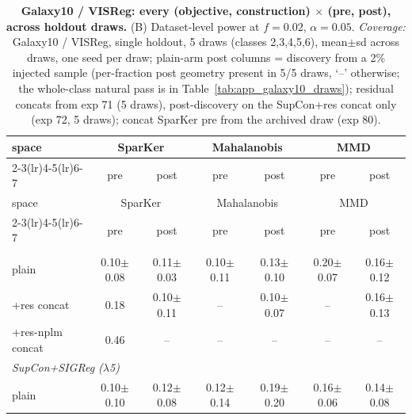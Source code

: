 \begin{center}
\small
\begin{longtable}{lcccccc}
\caption{\textbf{Galaxy10 / VISReg: every (objective, construction) $\times$ (pre, post), across holdout draws.} (B) Dataset-level power at $f=0.02$, $\alpha=0.05$. \emph{Coverage:} Galaxy10 / VISReg, single holdout, 5 draws (classes 2,3,4,5,6), mean$\pm$sd across draws, one seed per draw; plain-arm post columns = discovery from a 2\% injected sample (per-fraction post geometry present in 5/5 draws, `--' otherwise; the whole-class natural pass is in Table~\ref{tab:app_galaxy10_draws}); residual concats from exp 71 (5 draws), post-discovery on the SupCon+res concat only (exp 72, 5 draws); concat SparKer pre from the archived draw (exp 80).}\label{tab:grid_galaxy10_visreg_b}\\
\toprule
space & \multicolumn{2}{c}{SparKer} & \multicolumn{2}{c}{Mahalanobis} & \multicolumn{2}{c}{MMD} \\
\cmidrule(lr){2-3}\cmidrule(lr){4-5}\cmidrule(lr){6-7}
& pre & post & pre & post & pre & post \\
\midrule
\endfirsthead
\toprule
space & \multicolumn{2}{c}{SparKer} & \multicolumn{2}{c}{Mahalanobis} & \multicolumn{2}{c}{MMD} \\
\cmidrule(lr){2-3}\cmidrule(lr){4-5}\cmidrule(lr){6-7}
& pre & post & pre & post & pre & post \\
\midrule
\endhead
\bottomrule
\endfoot
\multicolumn{7}{l}{\emph{SupCon}} \\
\quad plain & 0.10$\pm$0.08 & 0.11$\pm$0.03 & 0.10$\pm$0.11 & 0.13$\pm$0.10 & 0.20$\pm$0.07 & 0.16$\pm$0.12 \\
\quad +res concat & 0.18 & 0.10$\pm$0.11 & -- & 0.10$\pm$0.07 & -- & 0.16$\pm$0.13 \\
\quad +res-nplm concat & 0.46 & -- & -- & -- & -- & -- \\
\multicolumn{7}{l}{\emph{SupCon+SIGReg ($\lambda$5)}} \\
\quad plain & 0.10$\pm$0.10 & 0.12$\pm$0.08 & 0.12$\pm$0.14 & 0.19$\pm$0.20 & 0.16$\pm$0.06 & 0.14$\pm$0.08 \\

\end{longtable}
\end{center}
